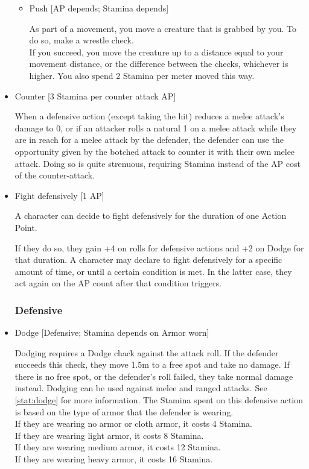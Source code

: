 \begin{itemize}
\begin{itemize}
    \item Push [AP depends; Stamina depends]

        As part of a movement, you move a creature that is grabbed by you.
        To do so, make a wrestle check.\\
        If you succeed, you move the creature up to a distance equal to your movement distance, or the difference between the checks, whichever is higher.
        You also spend 2 Stamina per meter moved this way.

\end{itemize}

\item Counter [3 Stamina per counter attack AP]

When a defensive action (except taking the hit) reduces a melee attack's damage to 0, or if an attacker rolls a natural 1 on a melee attack while they are in reach for a melee attack by the defender, the defender can use the opportunity given by the botched attack to counter it with their own melee attack.
Doing so is quite strenuous, requiring Stamina instead of the AP cost of the counter-attack.


\item Fight defensively [1 AP]

A character can decide to fight defensively for the duration of one Action Point.

If they do so, they gain +4 on rolls for defensive actions and +2 on Dodge for that duration.
A character may declare to fight defensively for a specific amount of time, or until a certain condition is met.
In the latter case, they act again on the AP count after that condition triggers.

\subsubsection{Defensive}\label{subsubsec:defensiveStaticCombatActions}


\item Dodge [Defensive; Stamina depends on Armor worn]

Dodging requires a Dodge chack against the attack roll.
If the defender succeeds this check, they move 1.5m to a free spot and take no damage.
If there is no free spot, or the defender's roll failed, they take normal damage instead.
Dodging can be used against melee and ranged attacks.
See \ref{stat:dodge} for more information.
The Stamina spent on this defensive action is based on the type of armor that the defender is wearing.\\
If they are wearing no armor or cloth armor, it costs 4 Stamina.\\
If they are wearing light armor, it costs 8 Stamina.\\
If they are wearing medium armor, it costs 12 Stamina.\\
If they are wearing heavy armor, it costs 16 Stamina.


\end{itemize}
